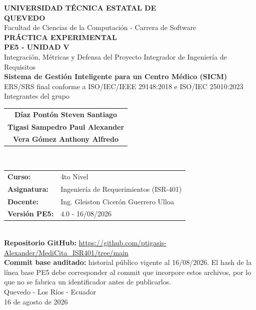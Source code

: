 \documentclass[11pt,a4paper]{article}
\begin{document}
	\begin{titlepage}\centering
		{\LARGE\bfseries UNIVERSIDAD TÉCNICA ESTATAL DE \\[0.5cm]
			QUEVEDO    }\\[0.95cm]
		{\large Facultad de Ciencias de la Computación - Carrera de Software}\\[1.0cm]
		{\Large\bfseries PRÁCTICA EXPERIMENTAL\\
			 PE5 - UNIDAD V}\\[0.25cm]
		{\large Integración, Métricas y Defensa del Proyecto Integrador de Ingeniería de Requisitos}\\[0.9cm]
		{\LARGE\bfseries Sistema de Gestión Inteligente para un Centro Médico (SICM)}\\[0.95cm]
		{\large ERS/SRS final conforme a ISO/IEC/IEEE 29148:2018 e ISO/IEC 25010:2023}\\[1cm]
		
				{\large Integrantes del grupo}\\[1cm]
		
		\begin{tabular}{c}
			\textbf{Díaz Pontón Steven Santiago}\\
			\textbf{Tigasi Sampedro Paul Alexander}\\
			\textbf{Vera Gómez Anthony Alfredo}
		\end{tabular}\\[0.9cm]
		
		\begin{tabular}{ll}\textbf{Curso:}&4to Nivel\\\textbf{Asignatura:}&Ingeniería de Requerimientos (ISR-401)\\\textbf{Docente:}&Ing. Gleiston Cicerón Guerrero Ulloa\\\textbf{Versión PE5:}&4.0 - 16/08/2026\end{tabular}\\[0.8cm]
		{\small\textbf{Repositorio GitHub:} \url{https://github.com/ptigasis-Alexander/MediCita_ISR401/tree/main}}\\[0.3cm]
		{\small\textbf{Commit base auditado:} historial público vigente al 16/08/2026. El hash de la línea base PE5 debe corresponder al commit que incorpore estos archivos, por lo que no se fabrica un identificador antes de publicarlos.}\\
		\vfill Quevedo - Los Ríos - Ecuador\\16 de agosto de 2026
	\end{titlepage}
	
\end{document}
